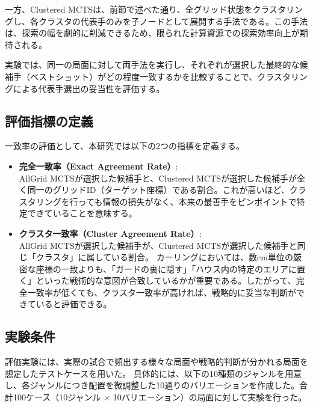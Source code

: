 \documentclass[11pt,a4j]{jreport}
\begin{document}
一方、Clustered MCTSは、前節で述べた通り、全グリッド状態をクラスタリングし、各クラスタの代表手のみを子ノードとして展開する手法である。この手法は、探索の幅を劇的に削減できるため、限られた計算資源での探索効率向上が期待される。

実験では、同一の局面に対して両手法を実行し、それぞれが選択した最終的な候補手（ベストショット）がどの程度一致するかを比較することで、クラスタリングによる代表手選出の妥当性を評価する。

\subsection{評価指標の定義}
一致率の評価として、本研究では以下の2つの指標を定義する。

\begin{itemize}

    \item \textbf{完全一致率（Exact Agreement Rate）}: \\
    AllGrid MCTSが選択した候補手と、Clustered MCTSが選択した候補手が全く同一のグリッドID（ターゲット座標）である割合。これが高いほど、クラスタリングを行っても情報の損失がなく、本来の最善手をピンポイントで特定できていることを意味する。
    
    \item \textbf{クラスタ一致率（Cluster Agreement Rate）}: \\
    AllGrid MCTSが選択した候補手が、Clustered MCTSが選択した候補手と同じ「クラスタ」に属している割合。
    カーリングにおいては、数cm単位の厳密な座標の一致よりも、「ガードの裏に隠す」「ハウス内の特定のエリアに置く」といった戦術的な意図が合致しているかが重要である。したがって、完全一致率が低くても、クラスタ一致率が高ければ、戦略的に妥当な判断ができていると評価できる。
    
\end{itemize}

\subsection{実験条件}
評価実験には、実際の試合で頻出する様々な局面や戦略的判断が分かれる局面を想定したテストケースを用いた。
具体的には、以下の10種類のジャンルを用意し、各ジャンルにつき配置を微調整した10通りのバリエーションを作成した。合計100ケース（10ジャンル $\times$ 10バリエーション）の局面に対して実験を行った。
\end{document}
